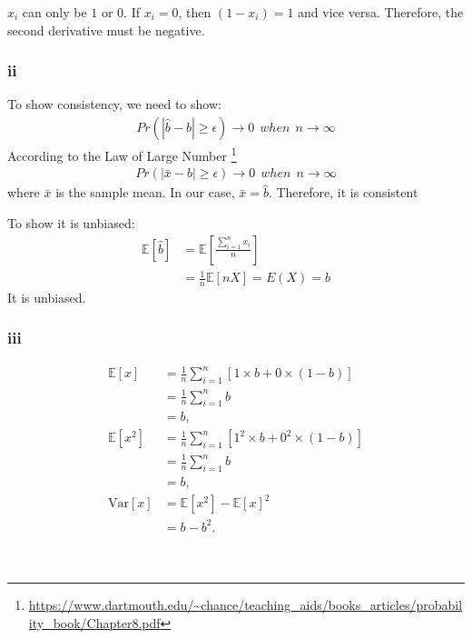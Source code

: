 \documentclass[twoside,11pt]{homework}
\begin{document}
$x_i$ can only be $1$ or $0$. If $x_i = 0$, then $(1-x_i)=1$ and vice versa. Therefore, the second derivative must be negative. 
\newpage

\subsubsection*{ii}
To show consistency, we need to show:
\begin{equation*}
\begin{split}
Pr(|\hat{b} - b| \geq \epsilon)  \to 0 ~~ when~~n \to \infty
\end{split}
\end{equation*}
According to the Law of Large Number \footnote{\url{https://www.dartmouth.edu/~chance/teaching_aids/books_articles/probability_book/Chapter8.pdf}}
\begin{equation*}
\begin{split}
Pr(|\bar{x} - b| \geq \epsilon)  \to 0 ~~ when~~n \to \infty
\end{split}
\end{equation*}
where $\bar{x}$ is the sample mean. In our case, $\bar{x} = \hat{b}$. Therefore, it is consistent

To show it is unbiased: 
\begin{equation*}
\begin{split}
\mathbb{E}[\hat{b}]  &= \mathbb{E}[\frac{\sum_{i=1}^{n}x_i}{n}] \\
									&= \frac{1}{n} \mathbb{E}[nX] = E(X) = b
\end{split}
\end{equation*}
It is unbiased. 
\newpage

\subsubsection*{iii}
%
\begin{equation}
\begin{split}
\mathbb{E} [x] &= \frac{1}{n} \sum_{i=1}^n [1 \times b + 0 \times (1-b)]\\
		      &= \frac{1}{n} \sum_{i=1}^n b \\
		      &= b, \\
\mathbb{E} [x^2 ] 	&= \frac{1}{n} \sum_{i=1}^n [1^2 \times b + 0^2 \times (1-b)]\\
		      &= \frac{1}{n} \sum_{i=1}^n b \\
		      &= b, \\
\mathrm{Var}[x] &= \mathbb{E} [x^2 ] - \mathbb{E} [x]^2 \\
		        &= b - b^2.
\end{split}
\end{equation}
%
\\\\
\end{document}
